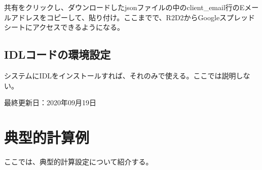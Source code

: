 \documentclass[letterpaper,10pt,dvipdfmx,report]{sphinxmanual}
\begin{document}
共有をクリックし、ダウンロードしたjsonファイルの中のclient\_email行のEメールアドレスをコピーして、貼り付け。ここまでで、R2D2からGoogleスプレッドシートにアクセスできるようになる。


\section{IDLコードの環境設定}
\label{\detokenize{environment:idl}}
システムにIDLをインストールすれば、それのみで使える。ここでは説明しない。

最終更新日：2020年09月19日


\chapter{典型的計算例}
\label{\detokenize{typical_case:id1}}\label{\detokenize{typical_case::doc}}
ここでは、典型的計算設定について紹介する。
\end{document}
